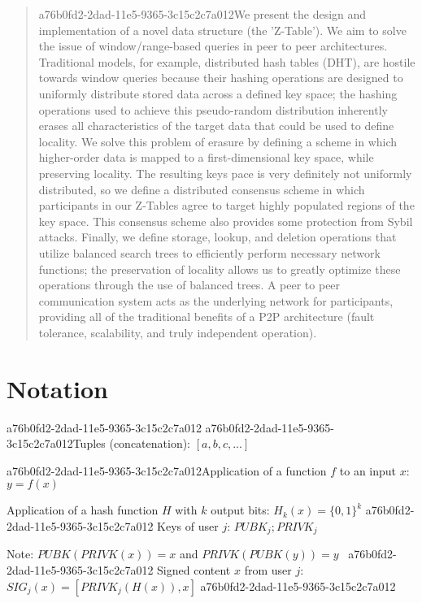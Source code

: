 \documentclass[12pt]{article}
\begin{document}
\maketitle

\begin{abstract}
a76b0fd2-2dad-11e5-9365-3c15c2c7a012We present the design and implementation of a novel data structure (the 'Z-Table'). We aim to solve the issue of window/range-based queries in peer to peer architectures. Traditional models, for example,  distributed hash tables (DHT), are hostile towards window queries because their hashing operations are designed to uniformly distribute stored data across a defined key space; the hashing operations used to achieve this pseudo-random distribution inherently erases all characteristics of the target data that could be used to define locality. We solve this problem of erasure by defining a scheme in which higher-order data is mapped to a first-dimensional key space, while preserving locality. The resulting keys pace is very definitely not uniformly distributed, so we define a distributed consensus scheme in which participants in our Z-Tables agree to target highly populated regions of the key space. This consensus scheme also provides some protection from Sybil attacks. Finally, we define storage, lookup, and deletion operations that utilize balanced search trees to efficiently perform necessary network functions; the preservation of locality allows us to greatly optimize these operations through the use of balanced trees. A peer to peer communication system acts as the underlying network for participants, providing all of the traditional benefits of a P2P architecture (fault tolerance, scalability, and truly independent operation).
\end{abstract}

\section{Notation}
a76b0fd2-2dad-11e5-9365-3c15c2c7a012
a76b0fd2-2dad-11e5-9365-3c15c2c7a012Tuples (concatenation): $[a,b,c,...]$

a76b0fd2-2dad-11e5-9365-3c15c2c7a012Application of a function $f$ to an input $x$: $y=f(x)$

Application of a hash function $H$ with $k$ output bits: $H_{k}(x) = \{0,1\}^k$
a76b0fd2-2dad-11e5-9365-3c15c2c7a012
Keys of user $j$: $ PUBK_j; PRIVK_j $

Note: $PUBK(PRIVK(x)) = x$ and $PRIVK(PUBK(y)) = y$~
a76b0fd2-2dad-11e5-9365-3c15c2c7a012
Signed content $x$ from user $j$: $SIG_j(x) = \left[ PRIVK_j( H(x) ), x \right]$
a76b0fd2-2dad-11e5-9365-3c15c2c7a012
\end{document}
